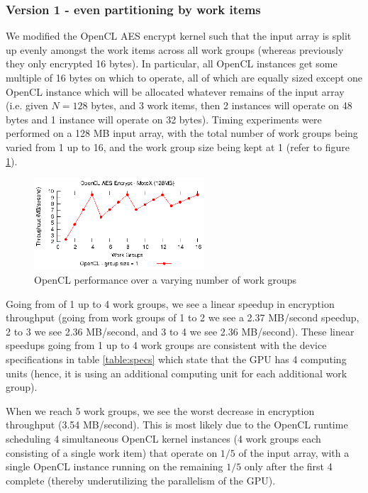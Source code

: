 \documentclass[conference,10pt]{IEEEtran}
\begin{document}
\subsubsection{Version 1 - even partitioning by work items}
\label{subsec:impl_partition}

We modified the OpenCL AES encrypt kernel such that the input array is split up evenly amongst the 
work items across all work groups (whereas previously they only encrypted 16 bytes). In particular, 
all OpenCL instances get some multiple of 16 bytes on which to operate, all of which are equally 
sized except one OpenCL instance which will be allocated whatever remains of the input array (i.e.  
given $N = 128$ bytes, and 3 work items, then 2 instances will operate on 48 bytes and 1 instance will 
operate on 32 bytes). Timing experiments were performed on a 128 MB input array, with the total 
number of work groups being varied from 1 up to 16, and the work group size being kept at 1 (refer 
to figure \ref{fig:num_work_groups}).

\begin{figure}[!t]
\centering
\includegraphics[width=2.5in]{../final/motox/4.2/sample_opencl_aes_global_worksize.128MB.16_max_global_worksize.again.report.eps}
\caption{OpenCL performance over a varying number of work groups}
\label{fig:num_work_groups}
\end{figure}

Going from of 1 up to 4 work groups, we see a linear speedup in encryption throughput (going from 
work groups of 1 to 2 we see a 2.37 MB/second speedup, 2 to 3 we see 2.36 MB/second, and 3 to 4 we 
see 2.36 MB/second). These linear speedups going from 1 up to 4 work groups are consistent with the 
device specifications in table \ref{table:specs} which state that the GPU has 4 computing units 
(hence, it is using an additional computing unit for each additional work group).

When we reach 5 work groups, we see the worst decrease in encryption throughput (3.54 MB/second).  
This is most likely due to the OpenCL runtime scheduling 4 simultaneous OpenCL kernel instances (4 
work groups each consisting of a single work item) that operate on $1/5$ of the input array, with a 
single OpenCL instance running on the remaining $1/5$ only after the first 4 complete (thereby 
underutilizing the parallelism of the GPU).
\end{document}
